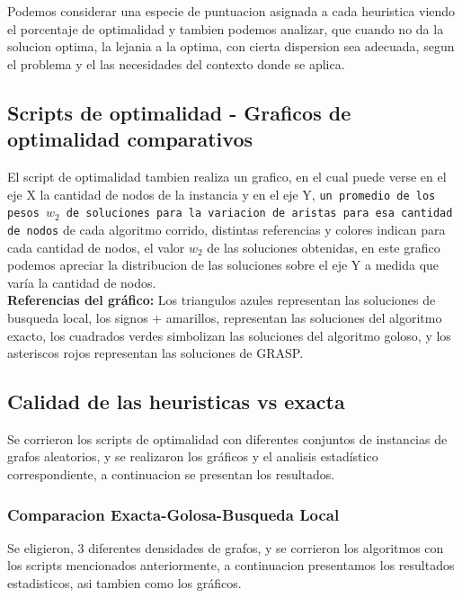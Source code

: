 Podemos considerar una especie de puntuacion asignada a cada heuristica viendo el porcentaje de optimalidad y tambien podemos analizar, que cuando no da la solucion optima, la lejania a la optima, con cierta dispersion sea adecuada, segun el problema y el las necesidades del contexto donde se aplica.

\subsection{Scripts de optimalidad - Graficos de optimalidad comparativos}
El script de optimalidad tambien realiza un grafico, en el cual puede verse en el eje X la cantidad de nodos de la instancia y en el eje Y, \texttt{un promedio de los pesos $w_2$ de soluciones para la variacion de aristas para esa cantidad de nodos} de cada algoritmo corrido, distintas referencias y colores indican para cada cantidad de nodos, el valor $w_2$ de las soluciones obtenidas, en este grafico podemos apreciar la distribucion de las soluciones sobre el eje Y a medida que var\'ia la cantidad de nodos.\\
\textbf{Referencias del gr\'afico: } Los triangulos azules representan las soluciones de busqueda local, los signos + amarillos, representan las soluciones del algoritmo exacto, los cuadrados verdes simbolizan las soluciones del algoritmo goloso, y los asteriscos rojos representan las soluciones de GRASP.

\subsection{Calidad de las heuristicas vs exacta}
Se corrieron los scripts de optimalidad con diferentes conjuntos de instancias de grafos aleatorios, y se realizaron los gr\'aficos y el analisis estad\'istico correspondiente, a continuacion se presentan los resultados.
\subsubsection{Comparacion Exacta-Golosa-Busqueda Local}
Se eligieron, 3 diferentes densidades de grafos, y se corrieron los algoritmos con los scripts mencionados anteriormente, a continuacion presentamos los resultados estadisticos, asi tambien como los gr\'aficos.

